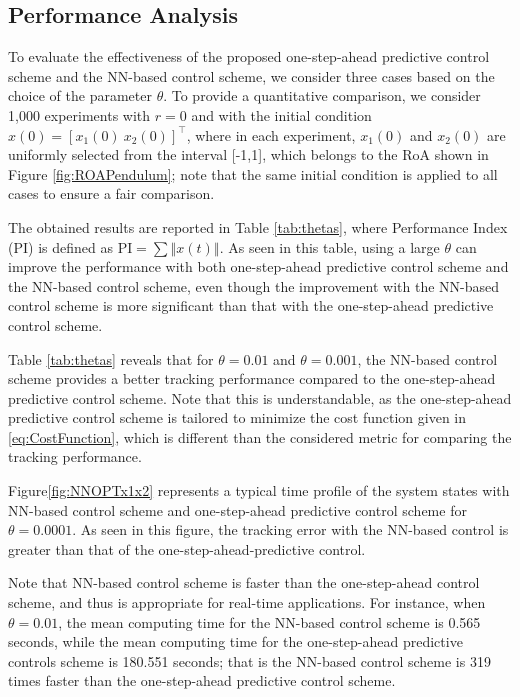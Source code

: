 \documentclass[1p,times]{elsarticle}
\begin{document}
\subsection{Performance Analysis}\label{sec:ExtensiveSimulation}
To evaluate the effectiveness of the proposed one-step-ahead predictive control scheme and the NN-based control scheme, we consider three cases based on the choice of the parameter $\theta$. To provide a quantitative comparison, we consider 1,000 experiments with $r=0$ and with the initial condition $x(0)=[x_1(0)~x_2(0)]^\top$, where in each experiment, $x_1(0)$ and $x_2(0)$ are uniformly selected from the interval [-1,1]{{\color{blue}}, which belongs to the RoA shown in Figure \ref{fig:ROAPendulum}}; note that the same initial condition is applied to all cases to ensure a fair comparison. 


The obtained results are reported in Table \ref{tab:thetas}, where Performance Index (PI) is defined as $\text{PI}=\sum\left\Vert x(t)\right\Vert$. As seen in this table, using a large $\theta$ can improve the performance with both one-step-ahead predictive control scheme and the NN-based control scheme, even though the improvement with the NN-based control scheme is more significant than that with the one-step-ahead predictive control scheme. 


Table \ref{tab:thetas} reveals that for $\theta=0.01$ and $\theta=0.001$, the NN-based control scheme provides a better tracking performance compared to the one-step-ahead predictive control scheme. Note that this is understandable, as the one-step-ahead predictive control scheme is tailored to minimize the cost function given in \eqref{eq:CostFunction}, which is different than the considered metric for comparing the tracking performance.


Figure\ref{fig:NNOPTx1x2} represents a typical time profile of the system states with NN-based control scheme and one-step-ahead predictive control scheme for $\theta=0.0001$. As seen in this figure, the tracking error with the NN-based control is greater than that of the one-step-ahead-predictive control.


{{\color{blue}}Note that NN-based control scheme is faster than the one-step-ahead control scheme, and thus is appropriate for real-time applications. For instance, when $\theta=0.01$, the mean computing time for the NN-based control scheme is 0.565 seconds, while the mean computing time for the one-step-ahead predictive controls scheme is 180.551 seconds; that is the NN-based control scheme is 319 times faster than the one-step-ahead predictive control scheme.}
\end{document}
